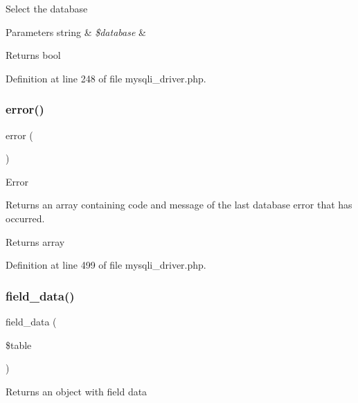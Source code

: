 Select the database


\begin{DoxyParams}[1]{Parameters}
string & {\em \$database} & \\
\hline
\end{DoxyParams}
\begin{DoxyReturn}{Returns}
bool 
\end{DoxyReturn}


Definition at line 248 of file mysqli\+\_\+driver.\+php.

\mbox{\label{class_c_i___d_b__mysqli__driver_a43b8d30b879d4f09ceb059b02af2bc02}} 
\subsubsection{\texorpdfstring{error()}{error()}}
{\footnotesize\ttfamily error (\begin{DoxyParamCaption}{ }\end{DoxyParamCaption})}

Error

Returns an array containing code and message of the last database error that has occurred.

\begin{DoxyReturn}{Returns}
array 
\end{DoxyReturn}


Definition at line 499 of file mysqli\+\_\+driver.\+php.

\mbox{\label{class_c_i___d_b__mysqli__driver_a90355121e1ed009e0efdbd544ab56efa}} 
\subsubsection{\texorpdfstring{field\_data()}{field\_data()}}
{\footnotesize\ttfamily field\+\_\+data (\begin{DoxyParamCaption}\item[{}]{\$table }\end{DoxyParamCaption})}

Returns an object with field data


